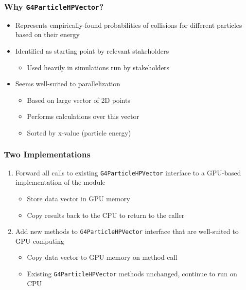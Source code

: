\documentclass{beamer}
\begin{document}
\begin{frame}
\frametitle{Why \texttt{G4ParticleHPVector}?}
\begin{itemize}
\item Represents empirically-found probabilities of collisions for different particles based on their energy
\item Identified as starting point by relevant stakeholders
\begin{itemize}
\item Used heavily in simulations run by stakeholders
\end{itemize}
\item Seems well-suited to parallelization
\begin{itemize}
\item Based on large vector of 2D points
\item Performs calculations over this vector
\item Sorted by x-value (particle energy)
\end{itemize}
\end{itemize}
\end{frame}

\begin{frame}
\frametitle{Two Implementations}
\begin{enumerate}
\item Forward all calls to existing \texttt{G4ParticleHPVector} interface to a GPU-based implementation of the module

\begin{itemize}
\item Store data vector in GPU memory
\item Copy results back to the CPU to return to the caller
\end{itemize}

\item Add new methods to \texttt{G4ParticleHPVector} interface that are well-suited to GPU computing
\begin{itemize}
\item Copy data vector to GPU memory on method call
\item Existing \texttt{G4ParticleHPVector} methods unchanged, continue to run on CPU
\end{itemize}
\end{enumerate}
\end{frame}
\end{document}
